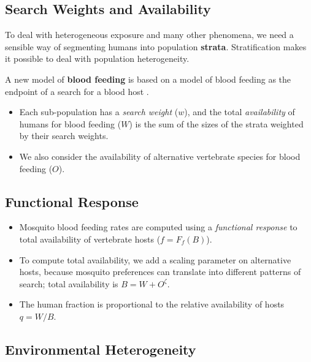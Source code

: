 \documentclass[
]{book}
\begin{document}
\subsection{Search Weights and Availability}\label{search-weights-and-availability}

To deal with heterogeneous exposure and many other phenomena, we need a sensible way of segmenting humans into population \textbf{strata}. Stratification makes it possible to deal with population heterogeneity.

A new model of \textbf{blood feeding} is based on a model of blood feeding as the endpoint of a search for a blood host \autocite{WuSL2023SpatialDynamics}.

\begin{itemize}
\item
  Each sub-population has a \emph{search weight} (\(w\)), and the total \emph{availability} of humans for blood feeding (\(W\)) is the sum of the sizes of the strata weighted by their search weights.
\item
  We also consider the availability of alternative vertebrate species for blood feeding (\(O\)).
\end{itemize}

\subsection{Functional Response}\label{functional-response}

\begin{itemize}
\item
  Mosquito blood feeding rates are computed using a \emph{functional response} to total availability of vertebrate hosts (\(f = F_f(B)\)).
\item
  To compute total availability, we add a scaling parameter on alternative hosts, because mosquito preferences can translate into different patterns of search; total availability is \(B=W + O^\zeta\).
\item
  The human fraction is proportional to the relative availability of hosts \(q = W/B\).
\end{itemize}

\subsection{Environmental Heterogeneity}\label{environmental-heterogeneity}
\end{document}
